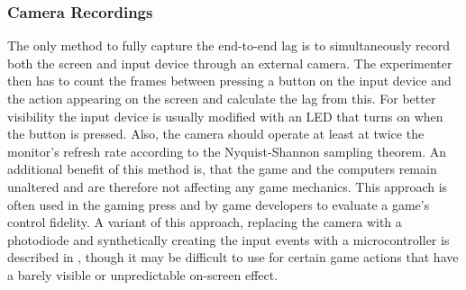 \subsubsection{Camera Recordings}

The only method to fully capture the end-to-end lag is to 
simultaneously record both the screen and input device through an 
external camera. The experimenter then has to count the frames between 
pressing a button on the input device and the action appearing on the 
screen and calculate the lag from this. For better visibility the input 
device is usually modified with an LED that turns on when the button is 
pressed. Also, the camera should operate at least at twice the 
monitor's refresh rate according to the Nyquist-Shannon sampling 
theorem. An additional benefit of this method is, that the game and the 
computers remain unaltered and are therefore not affecting any game 
mechanics. This approach is often used in the gaming press and by game 
developers to evaluate a game's control fidelity. A variant of this 
approach, replacing the camera with a photodiode and synthetically 
creating the input events with a microcontroller is described in 
\cite{beyermethod}, though it may be difficult to use for certain game 
actions that have a barely visible or unpredictable on-screen effect.








